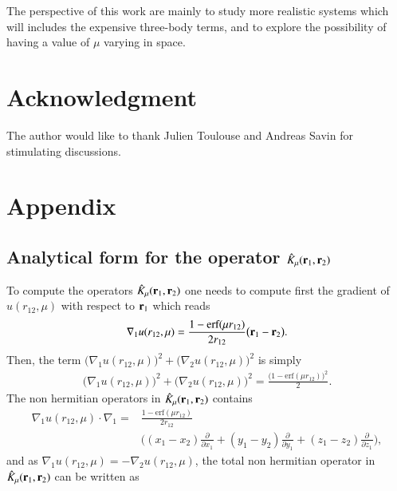 \documentclass[aip,jcp,reprint,noshowkeys,superscriptaddress,twocolumn]{revtex4-1}
\newcommand{\deriv}[3]{\frac{\partial^{#3} #1}{\partial {#2}^{#3}}}
\newcommand{\br}[0]{{\bf {r}}}
\newcommand{\bri}[1]{{\bf r}_{#1}}
\begin{document}
The perspective of this work are mainly to study more realistic systems which will includes the expensive three-body terms, and to explore the possibility of having a value of $\mu$ varying in space. 

\section{Acknowledgment}
The author would like to thank Julien Toulouse and Andreas Savin for stimulating discussions. 

\section{Appendix}
\subsection{Analytical form for the operator $\hat{K}_\mu(\bri{1},\bri{2}) $}
\label{k_l_appendix}
To compute the operators $\hat{K}_\mu(\bri{1},\bri{2})$ one needs to compute first the gradient of $u(r_{12},\mu)$ with respect to $\bri{1}$ which reads 
\begin{equation}
 \label{eq:nabla_u}
 \begin{aligned}
 \nabla_1 u(r_{12},\mu) = \frac{1 - \text{erf}(\mu r_{12})}{2 r_{12}} \big( \br{}_1 - \br{}_2 \big).
 \end{aligned}
\end{equation}
Then, the term $\big(\nabla_1 u(r_{12},\mu) \big) ^2 + \big(\nabla_2 u(r_{12},\mu) \big) ^2$ is simply 
\begin{equation}
 \begin{aligned}
 \big(\nabla_1 u(r_{12},\mu) \big) ^2 + \big(\nabla_2 u(r_{12},\mu) \big) ^2 = \frac{\bigg(1 - \text{erf}(\mu r_{12}) \bigg)^2}{2}.
 \end{aligned}
\end{equation}
The non hermitian operators in $\hat{K}_\mu(\bri{1},\bri{2})$ contains 
\begin{equation}
 \begin{aligned}
 \nabla_1 u(r_{12},\mu) \cdot \nabla_1  = &\frac{1 - \text{erf}(\mu r_{12})}{2 r_{12}} \\ 
                                          &\bigg( (x_1 - x_2) \deriv{}{x_1}{} + (y_1 - y_2) \deriv{}{y_1}{} + (z_1 - z_2) \deriv{}{z_1}{}\bigg),
 \end{aligned}
\end{equation}
and as $\nabla_1 u(r_{12},\mu) = - \nabla_2 u(r_{12},\mu)$,   
the total non hermitian operator in $\hat{K}_\mu(\bri{1},\bri{2})$ can be written as 
\end{document}

